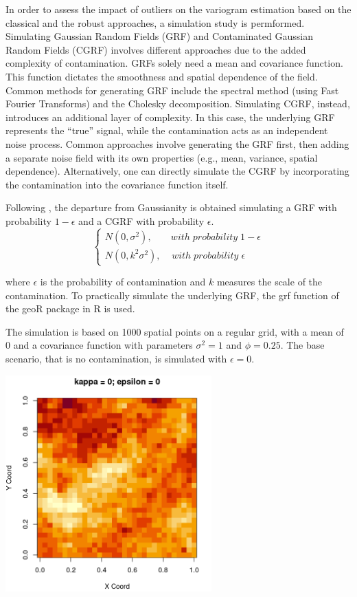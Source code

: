 \documentclass[
  12pt]{article}
\begin{document}
In order to assess the impact of outliers on the variogram estimation
based on the classical and the robust approaches, a simulation study is
permformed. Simulating Gaussian Random Fields (GRF) and Contaminated
Gaussian Random Fields (CGRF) involves different approaches due to the
added complexity of contamination. GRFs solely need a mean and
covariance function. This function dictates the smoothness and spatial
dependence of the field. Common methods for generating GRF include the
spectral method (using Fast Fourier Transforms) and the Cholesky
decomposition. Simulating CGRF, instead, introduces an additional layer
of complexity. In this case, the underlying GRF represents the ``true''
signal, while the contamination acts as an independent noise process.
Common approaches involve generating the GRF first, then adding a
separate noise field with its own properties (e.g., mean, variance,
spatial dependence). Alternatively, one can directly simulate the CGRF
by incorporating the contamination into the covariance function itself.

Following \citet{cre:1980}, the departure from Gaussianity is obtained
simulating a GRF with probability \(1 - \epsilon\) and a CGRF with
probability \(\epsilon\).\\
\[
\begin{cases}
  N(0, \sigma^2), \;\;\;\;\;\;\; with \; probability \; 1-\epsilon \\
  N(0, k^2 \sigma^2), \;\;\;\; with \; probability \; \epsilon
\end{cases}
\]

where \(\epsilon\) is the probability of contamination and \(k\)
measures the scale of the contamination. To practically simulate the
underlying GRF, the grf function of the geoR package in R is used.

The simulation is based on 1000 spatial points on a regular grid, with a
mean of 0 and a covariance function with parameters \(\sigma^2 = 1\) and
\(\phi = 0.25\). The base scenario, that is no contamination, is
simulated with \(\epsilon = 0\).

\begin{center}
\includegraphics[width=3.125in,height=\textheight]{img/grf.png}
\end{center}
\end{document}
